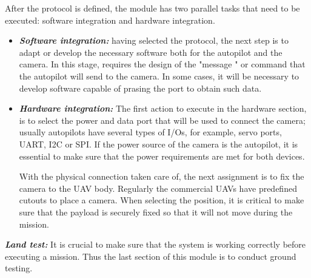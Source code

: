 After the protocol is defined, the module has two parallel tasks that need to be executed: software integration and hardware integration.
\begin{itemize}
    \item \textbf{\textit{Software integration:}} having selected the protocol, the next step is to adapt or develop the necessary software both for the autopilot and the camera. In this stage, requires the design of the "message " or command that the autopilot will send to the camera. In some cases, it will be necessary to develop software capable of prasing the port to obtain such data.
     \item \textbf{\textit{Hardware integration:}} The first action to execute in the hardware section, is to select the power and data port that will be used to connect the camera; usually autopilots have several types of I/Os, for example, servo ports, UART, I2C or SPI. If the power source of the camera is the autopilot, it is essential to make sure that the power requirements are met for both devices.
     
With the physical connection taken care of, the next assignment is to fix the camera to the UAV body. Regularly the commercial UAVs have predefined cutouts to place a camera. When selecting the position, it is critical to make sure that the payload is securely fixed so that it will not move during the mission.
     
\end{itemize}
\textit{\textbf{Land test:}} It is crucial to make sure that the system is working correctly before executing a mission. Thus the last section of this module is to conduct ground testing.


